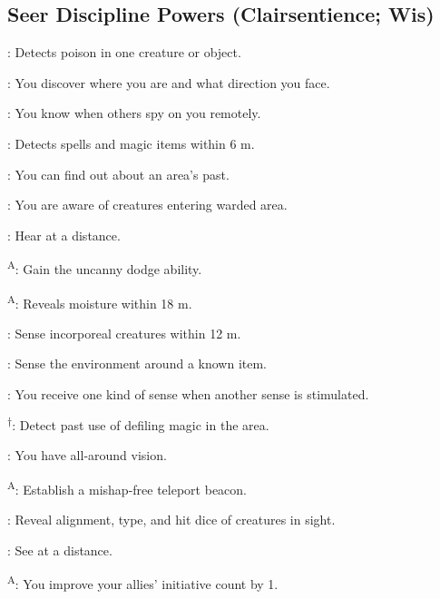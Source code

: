 \subsection{Seer Discipline Powers {\normalsize(Clairsentience; Wis)}}
\begin{enumerate*}
\item {}: Detects poison in one creature or object.

      : You discover where you are and what direction you face.

      : You know when others spy on you remotely.

\item {}: Detects spells and magic items within 6 m.

      : You can find out about an area's past.

      : You are aware of creatures entering warded area.

\item {}: Hear at a distance.

      \textsuperscript{A}: Gain the uncanny dodge ability.

      \textsuperscript{A}: Reveals moisture within 18 m.

      : Sense incorporeal creatures within 12 m.

      : Sense the environment around a known item.

      : You receive one kind of sense when another sense is stimulated.

      \textsuperscript{$\dagger$}: Detect past use of defiling magic in the area.

      : You have all-around vision.

\item {}\textsuperscript{A}: Establish a mishap-free teleport beacon.

      : Reveal alignment, type, and hit dice of creatures in sight.

      : See at a distance.

      \textsuperscript{A}: You improve your allies' initiative count by 1.


\end{enumerate*}
